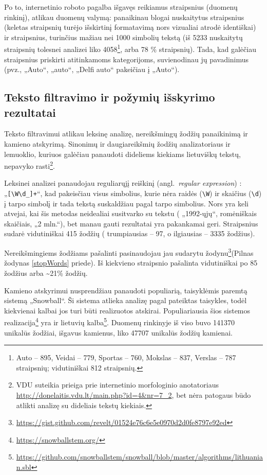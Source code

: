 \documentclass{VUMIFInfKursinis}
\newcommand{\ltang}[2]{#1 (angl.\  \textit{#2}) }
\begin{document}
Po to, internetinio roboto pagalba išgavęs reikiamus straipsnius
(duomenų rinkinį), atlikau duomenų valymą: panaikinau blogai nuskaitytus
straipsnius (keletas straipsnių turėjo išskirtinį formatavimą nors
vizualiai atrodė identiškai) ir straipsnius, turinčius mažiau nei 1000
simbolių tekstą (iš 5233 nuskaitytų straipsnių tolesnei analizei liko
4058\footnote{Auto – 895, Veidai – 779, Sportas – 760, Mokslas –
  837, Verslas – 787 straipsnių; vidutiniškai 812 straipsnių.}, arba 78
\% straipsnių). Tada, kad galėčiau straipsnius priskirti atitinkamoms
kategorijoms, suvienodinau jų pavadinimus (pvz., „Auto“, „auto“,
„Delfi auto“ pakeičiau į „Auto“).






\subsection{Teksto filtravimo ir požymių išskyrimo rezultatai}

Teksto filtravimui atlikau leksinę analizę, nereikšmingų žodžių
panaikinimą ir kamieno atskyrimą. Sinonimų ir daugiareikšmių žodžių
analizatoriaus ir lemuoklio, kuriuos galėčiau panaudoti dideliems
kiekiams lietuviškų tekstų, nepavyko rasti\footnote{VDU suteikia prieiga
  prie internetinio morfologinio anotatoriaus
  \url{http://donelaitis.vdu.lt/main.php?id=4\&nr=7_2}, bet nėra
  patogaus būdo atlikti analizę su dideliais tekstų kiekiais.}.

Leksinei analizei panaudojau \ltang{reguliarųjį reiškinį}{regular
expression}: „\texttt{{[}\textbackslash{}W\textbackslash{}d\_{]}+}“, kad
pakeisčiau visus simbolius, kurie nėra raidės (\texttt{\textbackslash{}W})
ir skaičius (\texttt{\textbackslash{}d}) į tarpo simbolį ir tada tekstą
suskaldžiau pagal tarpo simbolius. Nors yra keli atvejai, kai šis
metodas neidealiai susitvarko su tekstu ( „1992-ųjų“, romėniškais
skaičiais, „2 mln.“), bet manau gauti rezultatai yra pakankamai geri.
Straipsnius sudarė vidutiniškai 415 žodžių ( trumpiausias – 97, o
ilgiausias – 3335 žodžius).

Nereikšmingiems žodžiams pašalinti pasinaudojau jau sudarytu
žodynu\footnote{\url{https://gist.github.com/revelt/01524e76c6e5e0970d2d0fe8797e92ed}}(Pilnas
žodynas \ref{stopWords} priede). Iš kiekvieno straipsnio pašalinta vidutiniškai po 85
žodžius arba \textasciitilde{}21\% žodžių.

Kamieno atskyrimui nusprendžiau panaudoti populiarią, taisyklėmis
paremtą sistemą „Snowball“. Ši sistema atlieka analizę pagal pateiktas
taisykles, todėl kiekvienai kalbai jos turi būti realizuotos atskirai.
Populiariausia šios sistemos realizacija\footnote{\url{https://snowballstem.org/}}
yra ir lietuvių kalba\footnote{\url{https://github.com/snowballstem/snowball/blob/master/algorithms/lithuanian.sbl}}.
Duomenų rinkinyje iš viso buvo 141370 unikalūs žodžiai, išgavus
kamienus, liko 47707 unikalūs žodžių kamienai.
\end{document}
